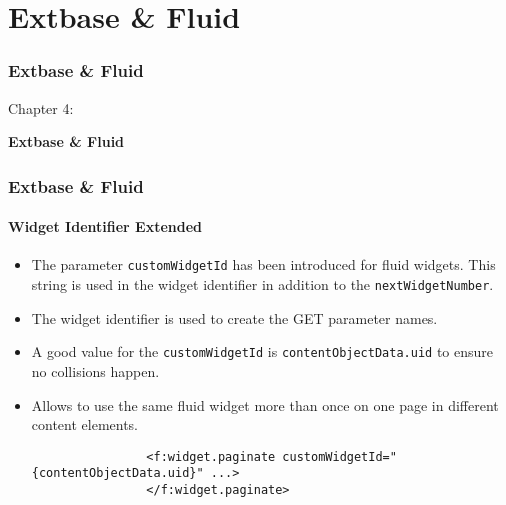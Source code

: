 %

\section{Extbase \& Fluid}
\begin{frame}[fragile]
	\frametitle{Extbase \& Fluid}

	\begin{center}\huge{Chapter 4:}\end{center}
	\begin{center}\huge{\color{typo3darkgrey}\textbf{Extbase \& Fluid}}\end{center}

\end{frame}


\begin{frame}[fragile]
	\frametitle{Extbase \& Fluid}
	\framesubtitle{Widget Identifier Extended}

	\begin{itemize}
		\item The parameter \texttt{customWidgetId} has been introduced for fluid widgets.
			This string is used in the widget identifier in addition to the \texttt{nextWidgetNumber}.

		\item The widget identifier is used to create the GET parameter names.

		\item A good value for the \texttt{customWidgetId} is \texttt{{contentObjectData.uid}} to ensure no collisions happen.

		\item Allows to use the same fluid widget more than once on one page in different content elements.

			\begin{lstlisting}
				<f:widget.paginate customWidgetId="{contentObjectData.uid}" ...>
				</f:widget.paginate>
			\end{lstlisting}

	\end{itemize}

\end{frame}

